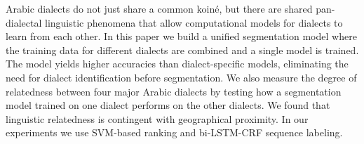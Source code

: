 Arabic dialects do not just share a common koiné, but there are shared pan-dialectal linguistic phenomena that allow computational models for dialects to learn from each other. In this paper we build a unified segmentation model where the training data for different dialects are combined and a single model is trained. The model yields higher accuracies than dialect-specific models, eliminating the need for dialect identification before segmentation. We also measure the degree of relatedness between four major Arabic dialects by testing how a segmentation model trained on one dialect performs on the other dialects. We found that linguistic relatedness is contingent with geographical proximity. In our experiments we use SVM-based ranking and bi-LSTM-CRF sequence labeling.
